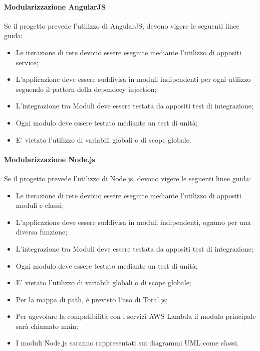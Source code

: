 \documentclass[../NormeDiProgetto.tex]{subfiles}
\begin{document}
                   \paragraph{Modularizzazione AngularJS}
                        Se il progetto prevede l'utilizzo di AngularJS, devono vigere le seguenti linee guida:
                        \begin{itemize}
                              \item Le iterazione di rete devono essere eseguite mediante l'utilizzo di appositi service;
                              \item L'applicazione deve essere suddivisa in moduli indipendenti per ogni utilizzo seguendo il pattern della dependecy injection;
                              \item L'integrazione tra Moduli deve essere testata da appositi test di integrazione;
                              \item Ogni modulo deve essere testato mediante un test di unità;
                              \item E' vietato l'utilizzo di variabili globali o di scope globale.
                        \end{itemize}

                  \paragraph{Modularizzazione Node.js}
                        Se il progetto prevede l'utilizzo di Node.js, devono vigere le seguenti linee guida:
                        \begin{itemize}
                              \item Le iterazione di rete devono essere eseguite mediante l'utilizzo di appositi moduli e classi;
                              \item L'applicazione deve essere suddivisa in moduli indipendenti, ognuno per una diversa funzione;
                              \item L'integrazione tra Moduli deve essere testata da appositi test di integrazione;
                              \item Ogni modulo deve essere testato mediante un test di unità;
                              \item E' vietato l'utilizzo di variabili globali o di scope globale;
                              \item Per la mappa di path, è previsto l'uso di Total.js;
                              \item Per agevolare la compatibilità con i servizi AWS Lambda il modulo principale sarà chiamato main;
                              \item I moduli Node.js saranno rappresentati sui diagrammi UML come classi.
                        \end{itemize}
\end{document}
